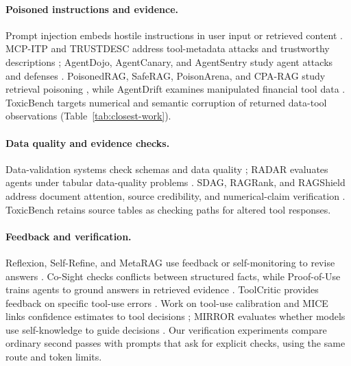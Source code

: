 \paragraph{Poisoned instructions and evidence.}
Prompt injection embeds hostile instructions in user input or retrieved content \citep{perez2022ignore,greshake2023indirect}. MCP-ITP and TRUSTDESC address tool-metadata attacks and trustworthy descriptions \citep{li2026mcpitp,ye2026trustdesc}; AgentDojo, AgentCanary, and AgentSentry study agent attacks and defenses \citep{debenedetti2024agentdojo,li2026agentcanary,zhang2026agentsentry}. PoisonedRAG, SafeRAG, PoisonArena, and CPA-RAG study retrieval poisoning \citep{zou2024poisonedrag,liang2025saferag,chen2025poisonarena,li2025cparag}, while AgentDrift examines manipulated financial tool data \citep{wu2026agentdrift}. ToxicBench targets numerical and semantic corruption of returned data-tool observations (Table~\ref{tab:closest-work}).

\paragraph{Data quality and evidence checks.}
Data-validation systems check schemas and data quality \citep{schelter2018automating,breck2019data}; RADAR evaluates agents under tabular data-quality problems \citep{gu2025radar}. SDAG, RAGRank, and RAGShield address document attention, source credibility, and numerical-claim verification \citep{dekel2026sdag,jia2025ragrank,patil2026ragshield}. ToxicBench retains source tables as checking paths for altered tool responses.

\paragraph{Feedback and verification.}
Reflexion, Self-Refine, and MetaRAG use feedback or self-monitoring to revise answers \citep{shinn2023reflexion,madaan2023selfrefine,zhou2024metarag}. Co-Sight checks conflicts between structured facts, while Proof-of-Use trains agents to ground answers in retrieved evidence \citep{zhang2025cosight,ma2025pou}. ToolCritic provides feedback on specific tool-use errors \citep{hamad2025toolcritic}. Work on tool-use calibration and MICE links confidence estimates to tool decisions \citep{xuan2026confidence,subramani2025mice}; MIRROR evaluates whether models use self-knowledge to guide decisions \citep{wang2026mirror}. Our verification experiments compare ordinary second passes with prompts that ask for explicit checks, using the same route and token limits.
